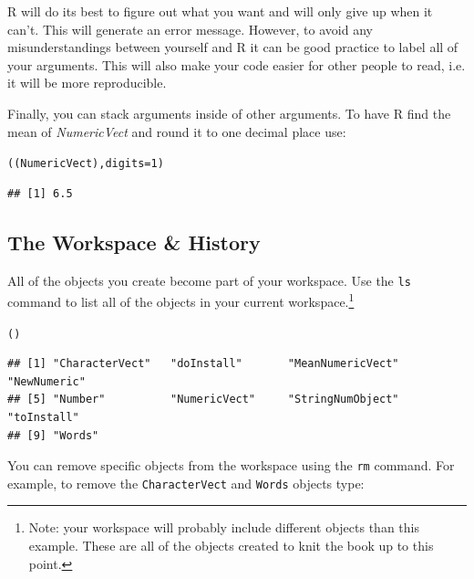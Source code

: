 \documentclass[krantz1]{krantz}
\begin{document}
\noindent R will do its best to figure out what you want and will only give up when it can't. This will generate an error message. However, to avoid any misunderstandings between yourself and R it can be good practice to label all of your arguments. This will also make your code easier for other people to read, i.e. it will be more reproducible.

Finally, you can stack arguments inside of other arguments. To have R find the mean of {\emph{NumericVect}} and round it to one decimal place use:

\begin{knitrout}
\color{fgcolor}\begin{kframe}
\begin{alltt}
((NumericVect), digits = 1)
\end{alltt}
\begin{verbatim}
## [1] 6.5
\end{verbatim}
\end{kframe}
\end{knitrout}


\subsection{The Workspace \& History}

All of the objects you create become part of your workspace. Use the \texttt{ls} command to list all of the objects in your current workspace.\footnote{Note: your workspace will probably include different objects than this example. These are all of the objects created to knit the book up to this point.}

\begin{knitrout}
\color{fgcolor}\begin{kframe}
\begin{alltt}
()
\end{alltt}
\begin{verbatim}
## [1] "CharacterVect"   "doInstall"       "MeanNumericVect" "NewNumeric"     
## [5] "Number"          "NumericVect"     "StringNumObject" "toInstall"      
## [9] "Words"
\end{verbatim}
\end{kframe}
\end{knitrout}


You can remove specific objects from the workspace using the \texttt{rm} command. For example, to remove the \texttt{CharacterVect} and \texttt{Words} objects type:
\end{document}
